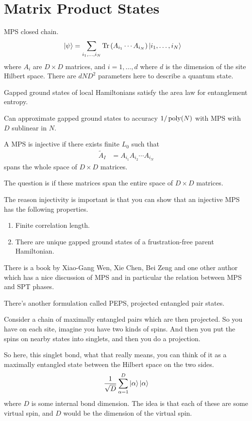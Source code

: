 \section{Matrix Product States}
MPS closed chain.
\begin{align}
    \ket{\psi} &=
    \sum_{i_1,\ldots,i_N} \Tr\left( 
    A_{i_1}\cdots A_{i_N}
    \right)
    \ket{i_1,\ldots,i_N}
\end{align}
where $A_i$ are $D\times D$ matrices, and $i=1,\ldots, d$ where
$d$ is the dimension of the site Hilbert space.
There are $dND^2$ parameters here to describe a quantum state.

Gapped ground states of local Hamiltonians satisfy the area law for entanglement
entropy.

Can approximate gapped ground states to accuracy $1/\operatorname{poly}(N)$
with MPS with $D$ sublinear in $N$.

A MPS is injective if there exists finite $L_0$ such that
\begin{align}
    \tilde{A}_I &=
    A_{i_1} A_{i_2} \cdots A_{i_N}
\end{align}
spans the whole space of $D\times D$ matrices.

The question is if these matrices span the entire space of $D\times D$
matrices.

The reason injectivity is important is that you can show that an injective MPS
has the following properties.
\begin{enumerate}
    \item Finite correlation length.
    \item There are unique gapped ground states of a frustration-free parent
        Hamiltonian.
\end{enumerate}

There is a book by Xiao-Gang Wen, Xie Chen, Bei Zeng and one other author which
has a nice discussion of MPS and in particular the relation between MPS and SPT
phases.

There's another formulation called PEPS,
projected entangled pair states.

Consider a chain of maximally entangled pairs which are then projected.
So you have on each site,
imagine you have two kinds of spins.
And then you put the spins on nearby states into singlets,
and then you do a projection.

So here, 
this singlet bond,
what that really means,
you can think of it as a maximally entangled state between the Hilbert space on
the two sides.
\begin{align}
    \frac{1}{\sqrt{D}} \sum_{\alpha=1}^{D} \ket{\alpha}\ket{\alpha}
\end{align}
where $D$ is some internal bond dimension.
The idea is that each of these are some virtual spin,
and $D$ would be the dimension of the virtual spin.

